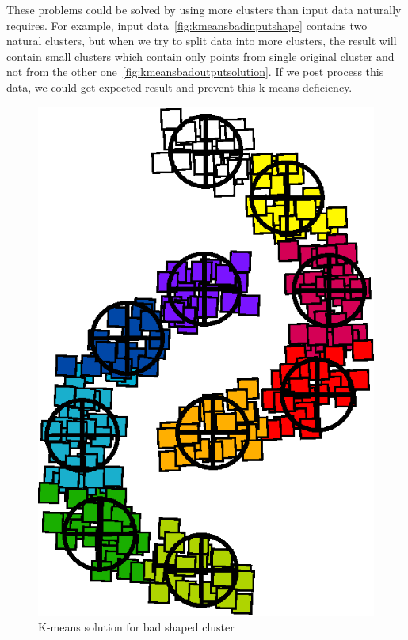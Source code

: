 These problems could be solved by using more clusters than input data naturally requires. For example, input data~\autoref{fig:kmeansbadinputshape} contains two natural clusters, but when we try to split data into more clusters, the result will contain small clusters which contain only points from single original cluster and not from the other one~\autoref{fig:kmeansbadoutputsolution}. If we post process this data, we could get expected result and prevent this k-means deficiency.
\begin{figure}[h]
  \centering
  \includegraphics[width=.3\textwidth]{img/kmeans_badOutputSampleShapeSolution.eps}
  \caption{K-means solution for bad shaped cluster}
  \label{fig:kmeansbadoutputsolution}
\end{figure}


